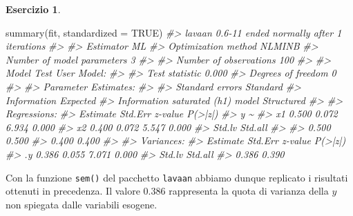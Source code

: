 \documentclass[
  11pt,
]{krantz}
\makeatletter
\newenvironment{Shaded}{\begin{snugshade}}{\end{snugshade}}
\newcommand{\AttributeTok}[1]{\textcolor[rgb]{0.61,0.61,0.61}{#1}}
\newcommand{\CommentTok}[1]{\textcolor[rgb]{0.37,0.37,0.37}{\textit{#1}}}
\newcommand{\ConstantTok}[1]{\textcolor[rgb]{0,0,0}{#1}}
\newcommand{\FunctionTok}[1]{\textcolor[rgb]{0,0,0}{#1}}
\newcommand{\NormalTok}[1]{#1}
\newenvironment{kframe}{%
\medskip{}
\setlength{\fboxsep}{.8em}
 \def\at@end@of@kframe{}%
 \ifinner\ifhmode%
  \def\at@end@of@kframe{\end{minipage}}%
  \begin{minipage}{\columnwidth}%
 \fi\fi%
 \def\FrameCommand##1{\hskip\@totalleftmargin \hskip-\fboxsep
 \colorbox{shadecolor}{##1}\hskip-\fboxsep
     \hskip-\linewidth \hskip-\@totalleftmargin \hskip\columnwidth}%
 \MakeFramed {\advance\hsize-\width
   \@totalleftmargin\z@ \linewidth\hsize
   \@setminipage}}%
 {\par\unskip\endMakeFramed%
 \at@end@of@kframe}
\renewenvironment{Shaded}{\begin{kframe}}{\end{kframe}}
\theoremstyle{definition}
\theoremstyle{definition}
\theoremstyle{definition}
\newtheorem{exercise}{Esercizio}[chapter]
\theoremstyle{definition}
\theoremstyle{remark}
\makeatother
\begin{document}
\begin{exercise}
\begin{Shaded}
\begin{Highlighting}[]
\FunctionTok{summary}\NormalTok{(fit, }\AttributeTok{standardized =} \ConstantTok{TRUE}\NormalTok{)}
\CommentTok{\#\textgreater{} lavaan 0.6{-}11 ended normally after 1 iterations}
\CommentTok{\#\textgreater{} }
\CommentTok{\#\textgreater{}   Estimator                                         ML}
\CommentTok{\#\textgreater{}   Optimization method                           NLMINB}
\CommentTok{\#\textgreater{}   Number of model parameters                         3}
\CommentTok{\#\textgreater{}                                                       }
\CommentTok{\#\textgreater{}   Number of observations                           100}
\CommentTok{\#\textgreater{}                                                       }
\CommentTok{\#\textgreater{} Model Test User Model:}
\CommentTok{\#\textgreater{}                                                       }
\CommentTok{\#\textgreater{}   Test statistic                                 0.000}
\CommentTok{\#\textgreater{}   Degrees of freedom                                 0}
\CommentTok{\#\textgreater{} }
\CommentTok{\#\textgreater{} Parameter Estimates:}
\CommentTok{\#\textgreater{} }
\CommentTok{\#\textgreater{}   Standard errors                             Standard}
\CommentTok{\#\textgreater{}   Information                                 Expected}
\CommentTok{\#\textgreater{}   Information saturated (h1) model          Structured}
\CommentTok{\#\textgreater{} }
\CommentTok{\#\textgreater{} Regressions:}
\CommentTok{\#\textgreater{}                    Estimate  Std.Err  z{-}value  P(\textgreater{}|z|)}
\CommentTok{\#\textgreater{}   y \textasciitilde{}                                                 }
\CommentTok{\#\textgreater{}     x1                0.500    0.072    6.934    0.000}
\CommentTok{\#\textgreater{}     x2                0.400    0.072    5.547    0.000}
\CommentTok{\#\textgreater{}    Std.lv  Std.all}
\CommentTok{\#\textgreater{}                   }
\CommentTok{\#\textgreater{}     0.500    0.500}
\CommentTok{\#\textgreater{}     0.400    0.400}
\CommentTok{\#\textgreater{} }
\CommentTok{\#\textgreater{} Variances:}
\CommentTok{\#\textgreater{}                    Estimate  Std.Err  z{-}value  P(\textgreater{}|z|)}
\CommentTok{\#\textgreater{}    .y                 0.386    0.055    7.071    0.000}
\CommentTok{\#\textgreater{}    Std.lv  Std.all}
\CommentTok{\#\textgreater{}     0.386    0.390}
\end{Highlighting}
\end{Shaded}

Con la funzione \texttt{sem()} del pacchetto \texttt{lavaan} abbiamo dunque replicato i risultati ottenuti in precedenza. Il valore \(0.386\) rappresenta la quota di varianza della \(y\) non spiegata dalle variabili esogene.
\end{exercise}
\end{document}
